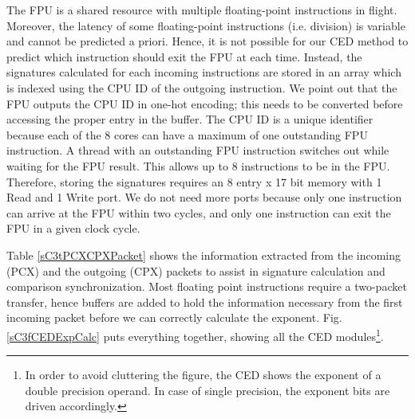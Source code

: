 \documentclass[12pt]{yalephd}
\newcommand{\subsubsubsection}[1] {\noindent {\underline {#1}}}
\begin{document}
\subsubsubsection{Comparison synchronization}\label{sC3sCEDstruct}

The FPU is a shared resource with multiple floating-point instructions in flight. Moreover, the latency of some floating-point instructions (i.e. division) is variable and cannot be predicted a priori. Hence, it is not possible for our CED method to predict which instruction should exit the FPU at each time. Instead, the signatures calculated for each incoming instructions are stored in an array which is indexed using the CPU ID of the outgoing instruction. We point out that the FPU outputs the CPU ID in one-hot encoding; this needs to be converted before accessing the proper entry in the buffer. The CPU ID is a unique identifier because each of the 8 cores can have a maximum of one outstanding FPU instruction. A thread with an outstanding FPU instruction switches out while waiting for the FPU result. This allows up to 8 instructions to be in the FPU. Therefore, storing the signatures requires an 8 entry x 17 bit memory with 1 Read and 1 Write port. We do not need more ports because only one instruction can arrive at the FPU within two cycles, and only one instruction can exit the FPU in a given clock cycle.

Table \ref{sC3tPCXCPXPacket} shows the information extracted from the incoming (PCX) and the outgoing (CPX) packets to assist in signature calculation and comparison synchronization. Most floating point instructions require a two-packet transfer, hence buffers are added to hold the information necessary from the first incoming packet before we can correctly calculate the exponent. Fig. \ref{sC3fCEDExpCalc} puts everything together, showing all the CED modules\footnote{In order to avoid cluttering the figure, the CED shows the exponent of a double precision operand. In case of single precision, the exponent bits are driven accordingly.}.
\end{document}
